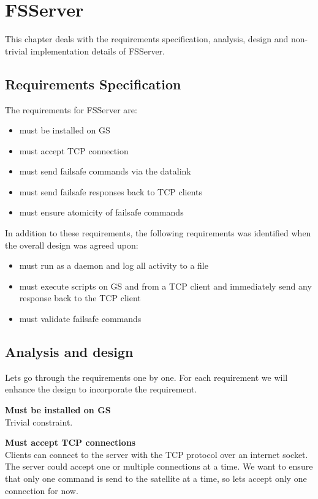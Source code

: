 \chapter{FSServer}
\label{chap:fsserver}
This chapter deals with the requirements specification, analysis, design and non-trivial implementation details of FSServer.

\section{Requirements Specification}

The requirements for FSServer are:

\begin{itemize}
	\item must be installed on GS
	\item must accept TCP connection
	\item must send failsafe commands via the datalink
	\item must send failsafe responses back to TCP clients
	\item must ensure atomicity of failsafe commands
\end{itemize}

In addition to these requirements, the following requirements was identified when the overall design was agreed upon:

\begin{itemize}
	\item must run as a daemon and log all activity to a file
	\item must execute scripts on GS and from a TCP client and immediately send any response back to the TCP client
	\item must validate failsafe commands
\end{itemize}









\section{Analysis and design}
Lets go through the requirements one by one. For each requirement we will enhance the design to incorporate the requirement.

\textbf{Must be installed on GS} \\
Trivial constraint.

\textbf{Must accept TCP connections} \\
Clients can connect to the server with the TCP protocol over an internet socket.
The server could accept one or multiple connections at a time. We want to ensure that only one command is send to the satellite at a time, so lets accept only one connection for now.

